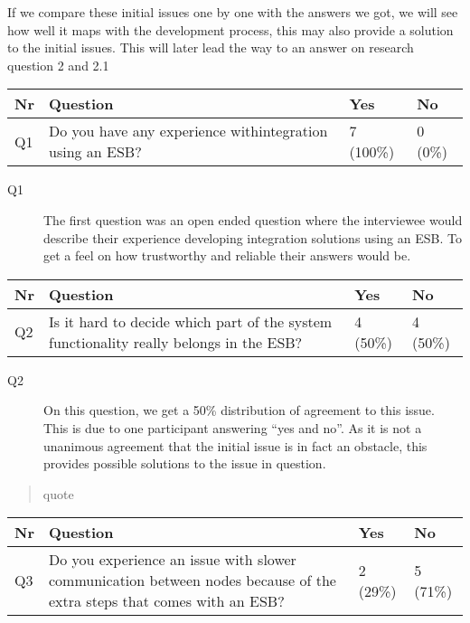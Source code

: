 \documentclass{llncs}
\begin{document}
If we compare these initial issues one by one with the answers we got, we will see how well it maps with the development process, this may also provide a solution to the initial issues. This will later lead the way to an answer on research question 2 and 2.1

\begin{tabular}{ | l | p{9cm} | l | l |}
\hline
Nr & Question & Yes & No \\ \hline
Q1 & Do you have any experience withintegration using an ESB? & 7 (100\%) & 0 (0\%) \\ \hline
\end{tabular}

\begin{description}
\item[Q1] The first question was an open ended question where the interviewee would describe their experience developing integration solutions using an ESB. To get a feel on how trustworthy and reliable their answers would be.
\end{description}

\begin{tabular}{ | l | p{9cm} | l | l |}
\hline
Nr & Question & Yes & No \\ \hline
Q2 & Is it hard to decide which part of the system functionality really belongs in the ESB? & 4 (50\%) & 4 (50\%)\\ \hline
\end{tabular}

\begin{description}
\item[Q2] On this question, we get a 50\% distribution of agreement to this issue. This is due to one participant answering “yes and no”. As it is not a unanimous agreement that the initial issue is in fact an obstacle, this provides possible solutions to the issue in question.
\end{description}

\begin{quote}
  quote
\end{quote}

\begin{tabular}{ | l | p{9cm} | l | l |}
\hline
Nr & Question & Yes & No \\ \hline
Q3 & Do you experience an issue with slower communication between nodes because of the extra steps that comes with an ESB? & 2 (29\%) & 5 (71\%) \\ \hline
\end{tabular}
\end{document}
